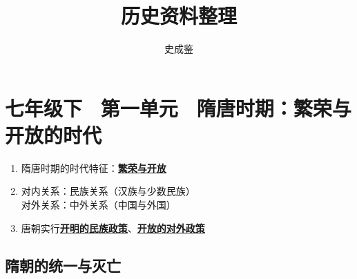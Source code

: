 \documentclass[12pt, a4paper, oneside]{ctexart}
\title{历史资料整理}
\author{史成鉴}
\date{}
\begin{document}
	\maketitle
	\newpage
	\tableofcontents
	\newpage
	\section{七年级下 \ 第一单元 \ 隋唐时期：繁荣与开放的时代}
	\begin{enumerate}
		\item 隋唐时期的时代特征：\underline{\textbf{繁荣与开放}}
		\item 对内关系：民族关系（汉族与少数民族）\\ 对外关系：中外关系（中国与外国）
		\item 唐朝实行\underline{\textbf{开明的民族政策}}、\underline{\textbf{开放的对外政策}}
	\end{enumerate}
	
	\subsection{隋朝的统一与灭亡}
	
\end{document}

